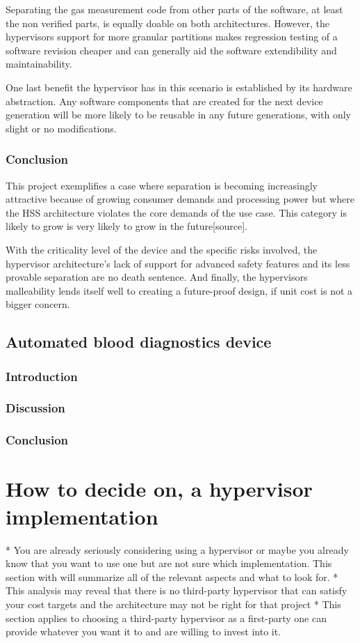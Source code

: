 Separating the gas measurement code from other parts of the software, at least the non verified parts, is equally doable on both architectures. However, the hypervisors support for more granular partitions makes regression testing of a software revision cheaper and can generally aid the software extendibility and maintainability.

One last benefit the hypervisor has in this scenario is established by its hardware abstraction. Any software components that are created for the next device generation will be more likely to be reusable in any future generations, with only slight or no modifications.
\subsubsection{Conclusion}
This project exemplifies a case where separation is becoming increasingly attractive because of growing consumer demands and processing power but where the \gls{HSS} architecture violates the core demands of the use case. This category is likely to grow is very likely to grow in the future[source].

With the criticality level of the device and the specific risks involved, the hypervisor architecture's lack of support for advanced safety features and its less provable separation are no death sentence. And finally, the hypervisors malleability lends itself well to creating a future-proof design, if unit cost is not a bigger concern. 
\subsection{Automated blood diagnostics device}
\subsubsection{Introduction}
\subsubsection{Discussion}
\subsubsection{Conclusion}



\section{How to decide on, a hypervisor implementation}
* You are already seriously considering using a hypervisor or maybe you already know that you want to use one but are not sure which implementation. This section with will summarize all of the relevant aspects and what to look for. 
* This analysis may reveal that there is no third-party hypervisor that can satisfy your cost targets and the architecture may not be right for that project
* This section applies to choosing a third-party hypervisor as a first-party one can provide whatever you want it to and are willing to invest into it.
